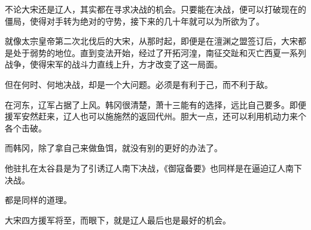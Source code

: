不论大宋还是辽人，其实都在寻求决战的机会。只要能在决战，便可以打破现在的僵局，使得对手转为绝对的守势，接下来的几十年就可以为所欲为了。

就像太宗皇帝第二次北伐后的大宋，从那时起，即便是在澶渊之盟签订后，大宋都是处于弱势的地位。直到变法开始，经过了开拓河湟，南征交趾和灭亡西夏一系列战争，使得宋军的战斗力直线上升，方才改变了这一局面。

但在何时、何地决战，却是一个大问题。必须是有利于己，而不利于敌。

在河东，辽军占据了上风。韩冈很清楚，萧十三能有的选择，远比自己要多。即便援军安然赶来，辽人也可以施施然的返回代州。胆大一点，还可以利用机动力来个各个击破。

而韩冈，除了拿自己来做鱼饵，就没有别的更好的办法了。

他驻扎在太谷县是为了引诱辽人南下决战，《御寇备要》也同样是在逼迫辽人南下决战。

都是同样的道理。

大宋四方援军将至，而眼下，就是辽人最后也是最好的机会。
